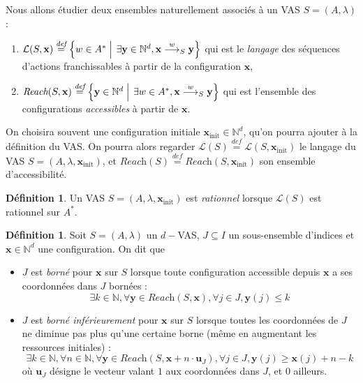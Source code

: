 \documentclass[a4paper,final]{article}
\theoremstyle{definition}
\newtheorem{Definition}[Theorem]{Définition}
\let\leq\leqslant
\let\geq\geqslant
\newcommand{\set}[2]{\left\{#1\mathrel{\left|\vphantom{#1}\vphantom{#2}\right.}#2\right\}}
\newcommand{\defeq}{\ensuremath{\stackrel{\textit{def}}{=}}}
\newcommand{\N}{\ensuremath{\mathbb{N}}}
\newcommand{\lang}{\ensuremath{\mathcal{L}}}
\newcommand{\reach}{\ensuremath{\textit{Reach}}}
\newcommand{\trans}[2]{\ensuremath{\stackrel{#1}{\longrightarrow}_{#2}}}
\newcommand{\vect}[1]{\ensuremath{\mathbf{#1}}}
\newcommand{\xinit}{\ensuremath{\vect{x}_\text{init}}}
\newcommand{\unite}[1]{\ensuremath{\vect{u}_{#1}}}
\begin{document}
Nous allons étudier deux ensembles naturellement associés à un VAS $S=(A,\lambda)$ :
\begin{enumerate}
    \item 
    $\lang(S,\vect{x})\defeq \set{w\in A^\ast} {\exists \vect{y}\in\N^d, \vect{x}\trans{w}{S}\vect{y}}$ qui est le \emph{langage} des séquences d'actions franchissables à partir de la configuration $\vect{x}$,
    
    \item $\reach(S,\vect{x})\defeq \set{\vect{y}\in\N^d} {\exists w\in A^\ast, \vect{x}\trans{w}{S} \vect{y}}$ qui est l'ensemble des configurations \emph{accessibles} à partir de $\vect{x}$. 
\end{enumerate}

\vspace{2mm}
On choisira souvent une configuration initiale $\xinit\in\N^d$, qu'on pourra ajouter à la définition du VAS.
On pourra alors regarder $\lang(S) \defeq \lang(S,\xinit)$ le langage du VAS $S = (A,\lambda,\xinit)$, et $\reach(S) \defeq \reach(S,\xinit)$ son ensemble d'accessibilité.

\begin{Definition}
Un VAS $S = (A,\lambda,\xinit)$ est \emph{rationnel} lorsque $\lang(S)$ est rationnel sur $A^\ast$.
\end{Definition}

\begin{Definition}
Soit $S = (A,\lambda)$ un $d-$VAS,
$J\subseteq I$ un sous-ensemble d'indices et $\vect{x}\in\N^d$ une configuration.
On dit que
\begin{itemize}
    \item $J$ est \emph{borné} pour $\vect{x}$ sur $S$ lorsque toute configuration accessible depuis $\vect{x}$ a ses coordonnées dans $J$ bornées :
    $$\exists k\in\N, \forall \vect{y}\in\reach(S,\vect{x}), \forall j\in J, \vect{y}(j)\leq k$$
    
    \item $J$ est \emph{borné inférieurement} pour $\vect{x}$ sur $S$ lorsque toutes les coordonnées de $J$ ne diminue pas plus qu'une certaine borne (même en augmentant les ressources initiales) :
    $$\exists k\in\N, \forall n\in\N, \forall \vect{y}\in\reach(S,\vect{x} + n\cdot\unite{J}), \forall j\in J, \vect{y}(j)\geq \vect{x}(j)+n-k$$
    où $\unite{J}$ désigne le vecteur valant $1$ aux coordonnées dans $J$, et $0$ ailleurs.
\end{itemize}
\end{Definition}
\end{document}

